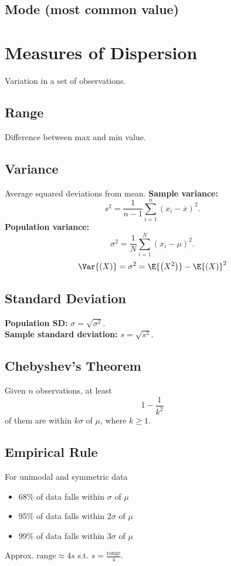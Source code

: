 \documentclass{article}
\begin{document}
\begin{multicols}{3}
    \subsection{Mode (most common value)}
    \section{Measures of Dispersion}
    Variation in a set of observations.
    \subsection{Range}
    Difference between max and min value.
    \subsection{Variance}
    Average squared deviations from mean.
    \textbf{Sample variance:}
    \begin{equation*}
        s^2 = \frac{1}{n - 1} \sum_{i = 1}^n (x_i - \overline{x})^2.
    \end{equation*}
    \textbf{Population variance:}
    \begin{equation*}
        \sigma^2 = \frac{1}{N} \sum_{i = 1}^N (x_i - \mu)^2.
    \end{equation*}
    \begin{equation*}
        \Var{\left( X \right)} = \sigma^2 = \E{\left( X^2 \right)} - \E{\left( X \right)}^2
    \end{equation*}
    \subsection{Standard Deviation}
    \textbf{Population SD:}
    \(
    \sigma = \sqrt{\sigma^2}.
    \) \\
    \textbf{Sample standard deviation:}
    \(
    s = \sqrt{s^2}.
    \)
    \subsection{Chebyshev's Theorem}
    Given \(n\) observations, at least
    \begin{equation*}
        1 - \frac{1}{k^2}
    \end{equation*}
    of them are within \(k \sigma\) of \(\mu\),
    where \(k \geq 1\).
    \subsection{Empirical Rule}
    For unimodal and symmetric data
    \begin{itemize}
        \item 68\% of data falls within \(\sigma\) of \(\mu\)
        \item 95\% of data falls within \(2\sigma\) of \(\mu\)
        \item 99\% of data falls within \(3\sigma\) of \(\mu\)
    \end{itemize}
    Approx. \(\text{range} \approx 4 s\)
    s.t. \(s = \frac{\text{range}}{4}\).

\end{multicols}
\end{document}
